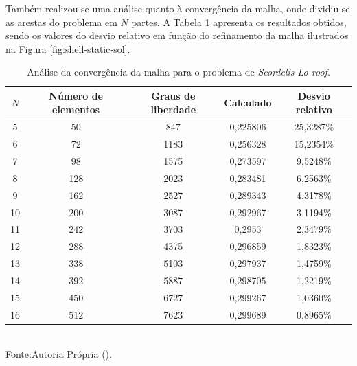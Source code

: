 Também realizou-se uma análise quanto à convergência da malha, onde dividiu-se as arestas do problema em $N$ partes. A Tabela \ref{tab:scordelis-sol} apresenta os resultados obtidos, sendo os valores do desvio relativo em função do refinamento da malha ilustrados na Figura \ref{fig:shell-static-sol}.

\begin{table}[h!]
    \centering
    \caption{Análise da convergência da malha para o problema de \textit{Scordelis-Lo roof}.}
    \begin{tabular}{ccccc}
        \hline
        $N$ & Número de elementos & Graus de liberdade & Calculado & Desvio relativo \\\hline
        5   & 50                  & 847                & 0,225806  & 25,3287\%       \\
        6   & 72                  & 1183               & 0,256328  & 15,2354\%       \\
        7   & 98                  & 1575               & 0,273597  & 9,5248\%        \\
        8   & 128                 & 2023               & 0,283481  & 6,2563\%        \\
        9   & 162                 & 2527               & 0,289343  & 4,3178\%        \\
        10  & 200                 & 3087               & 0,292967  & 3,1194\%        \\
        11  & 242                 & 3703               & 0,2953    & 2,3479\%        \\
        12  & 288                 & 4375               & 0,296859  & 1,8323\%        \\
        13  & 338                 & 5103               & 0,297937  & 1,4759\%        \\
        14  & 392                 & 5887               & 0,298705  & 1,2219\%        \\
        15  & 450                 & 6727               & 0,299267  & 1,0360\%        \\
        16  & 512                 & 7623               & 0,299689  & 0,8965\%        \\\hline
    \end{tabular}
    \\Fonte:Autoria Própria (\the\year).
    \label{tab:scordelis-sol}
\end{table}


